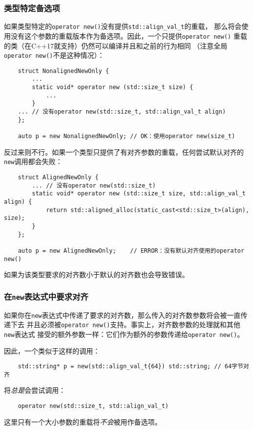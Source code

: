 \subsubsection{类型特定备选项}\label{ch30.2.2.2}
如果类型特定的\texttt{operator new()}没有提供\texttt{std::align\_val\_t}的重载，
那么将会使用没有这个参数的重载版本作为备选项。因此，一个只提供\texttt{operator new()}
重载的类（在C++17就支持）仍然可以编译并且和之前的行为相同
（注意全局\texttt{operator new()}不是这种情况）：
\begin{lstlisting}
    struct NonalignedNewOnly {
        ...
        static void* operator new (std::size_t size) {
            ...
        }
    ... // 没有operator new(std::size_t, std::align_val_t align)
    };

    auto p = new NonalignedNewOnly; // OK：使用operator new(size_t)
\end{lstlisting}
反过来则不行。如果一个类型只提供了有对齐参数的重载，任何尝试默认对齐的\texttt{new}调用都会失败：
\begin{lstlisting}
    struct AlignedNewOnly {
        ... // 没有operator new(std::size_t)
        static void* operator new (std::size_t size, std::align_val_t align) {
            return std::aligned_alloc(static_cast<std::size_t>(align), size);
        }
    };

    auto p = new AlignedNewOnly;    // ERROR：没有默认对齐使用的operator new()
\end{lstlisting}
如果为该类型要求的对齐数小于默认的对齐数也会导致错误。

\subsubsection{在\texttt{new}表达式中要求对齐}
如果你在\texttt{new}表达式中传递了要求的对齐数，那么传入的对齐数参数将会被一直传递下去
并且必须被\texttt{operator new()}支持。事实上，对齐数参数的处理就和其他\texttt{new}表达式
接受的额外参数一样：它们作为额外的参数传递给\texttt{operator new()}。

因此，一个类似于这样的调用：
\begin{lstlisting}
    std::string* p = new(std::align_val_t{64}) std::string; // 64字节对齐
\end{lstlisting}
将\emph{总是}会尝试调用：
\begin{lstlisting}
    operator new(std::size_t, std::align_val_t)
\end{lstlisting}
这里只有一个大小参数的重载将\emph{不会}被用作备选项。

